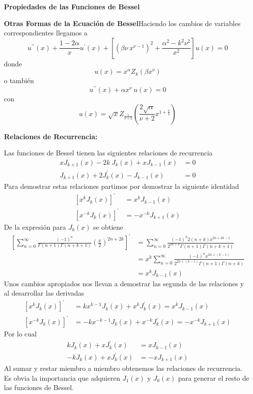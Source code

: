 \documentclass[spanish,notitlepage,letterpaper,12pt]{article}
\begin{document}
\begin{center}
\textbf{Propiedades de las Funciones de Bessel}
\end{center}

\textbf{Otras Formas de la Ecuaci\'{o}n de Bessel}\newline Haciendo los
cambios de variables correspondientes llegamos a
\[
u^{\prime\prime}(x)+\frac{1-2\alpha}xu^{\prime}(x)+\left[  \left(  \beta
\nu\ x^{\nu-1}\right)  ^{2}+\frac{\alpha^{2}-k^{2}\nu^{2}}{x^{2}}\right]
u(x)=0
\]
donde
\[
u(x)=x^{\alpha}Z_{k}(\beta x^{\nu})
\]
o tambi\'{e}n
\[
u^{\prime\prime}(x)+\alpha x^{\nu}\ u(x)=0
\]
con
\[
u(x)=\sqrt{x}Z_{\frac1{\nu+2}}\left(  \frac{2\sqrt{\alpha}}{\nu+2}%
x^{1+\frac\nu2}\right)
\]

\begin{center}
\textbf{Relaciones de Recurrencia:}
\end{center}

Las funciones de Bessel tienen las siguientes relaciones de recurrencia
\begin{align*}
xJ_{k+1}(x)-2k\ J_{k}(x)+xJ_{k-1}(x)  & =0\\
J_{k+1}(x)+2J_{k}^{\prime}(x)-J_{k-1}(x)  & =0
\end{align*}
Para demostrar estas relaciones partimos por demostrar la siguiente identidad
\begin{align*}
\left[  x^{k}J_{k}(x)\right]  ^{\prime}  & =x^{k}J_{k-1}(x)\\
\left[  x^{-k}J_{k}(x)\right]  ^{\prime}  & =-x^{-k}J_{k+1}(x)
\end{align*}
De la expresi\'{o}n para $J_{k}(x)$ se obtiene
\begin{align*}
\left[  \sum_{n=0}^{\infty}\frac{\left(  -1\right)  ^{n}}{\Gamma\left(
n+1\right)  \Gamma\left(  n+k+1\right)  }\left(  \frac x2\right)
^{2n+2k}\right]  ^{\prime}  & =\sum_{n=0}^{\infty}\frac{\left(  -1\right)
^{n}2\left(  n+k\right)  x^{2n+2k-1}}{2^{2n+k}\Gamma\left(  n+1\right)
\Gamma\left(  n+k+1\right)  }\\
& =x^{k}\sum_{n=0}^{\infty}\frac{\left(  -1\right)  ^{n}x^{2n+\left(
k-1\right)  }}{2^{2n+\left(  k-1\right)  }\Gamma\left(  n+1\right)
\Gamma\left(  n+k\right)  }\\
& =x^{k}J_{k-1}(x)
\end{align*}
Unos cambios apropiados nos llevan a demostrar las segunda de las relaciones y
al desarrollar las derivadas
\begin{align*}
\left[  x^{k}J_{k}(x)\right]  ^{\prime}  & =kx^{k-1}J_{k}(x)+x^{k}%
J_{k}^{\prime}(x)=x^{k}J_{k-1}(x)\\
\left[  x^{-k}J_{k}(x)\right]  ^{\prime}  & =-kx^{-k-1}J_{k}(x)+x^{-k}%
J_{k}^{\prime}(x)=-x^{-k}J_{k+1}(x)
\end{align*}
Por lo cual
\begin{align*}
kJ_{k}(x)+xJ_{k}^{\prime}(x)  & =xJ_{k-1}(x)\\
-kJ_{k}(x)+xJ_{k}^{\prime}(x)  & =-xJ_{k+1}(x)
\end{align*}
Al sumar y restar miembro a miembro obtenemos las relaciones de recurrencia.
Es obvia la importancia que adquieren $J_{1}(x)$ y $J_{0}(x)$ para generar el
resto de las funciones de Bessel.
\end{document}
